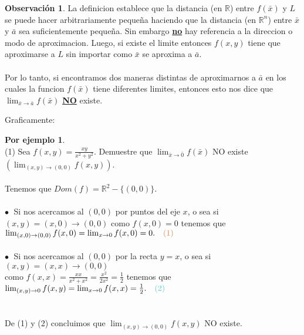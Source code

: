 \documentclass{article}
\theoremstyle{definition}
\theoremstyle{definition}
\newtheorem*{obs}{Observación}
\newtheorem*{ej}{Por ejemplo}
\theoremstyle{remark}
\newcommand\bl{$\bullet\;$}
\begin{document}
\begin{obs}
  La definicion establece que la distancia (en $\mathbb{R}$) entre $f(\bar{x})$ y $L$ se puede hacer arbitrariamente pequeña haciendo que la distancia (en $\mathbb{R}^n$) entre $\bar{x}$ y $\bar{a}$ sea suficientemente pequeña. Sin embargo \underline{\textbf{no}} hay referencia a la direccion o modo de aproximacion. Luego, si existe el limite entonces $f(x,y)$ tiene que aproximarse a $L$ sin importar como $\bar{x}$ se aproxima a $\bar{a}$. \\\\ Por lo tanto, si encontramos dos maneras distintas de aproximarnos a $\bar{a}$ en los cuales la funcion $f(\bar{x})$ tiene diferentes limites, entonces esto nos dice que $\lim_{\bar{x} \to \bar{a}}{f(\bar{x})}$ \underline{\textbf{NO}} existe.
\end{obs}\pagebreak
Graficamente:
\begin{figure}[h]
\centering
\def\svgwidth{0.55\textwidth}

\end{figure}
\begin{ej}
  \; \\
  \textcolor{verdep2}{(1)} Sea $f(x,y)=\frac{xy}{x^2+y^2}$. Demuestre que $\lim_{\bar{x} \to \bar{0}}{f(\bar{x})}$ NO existe $\left(\lim_{(x,y) \to (0,0)}{f(x,y)}\right)$.\\\\
  Tenemos que $Dom(f)=\mathbb{R}^2-\big\{(0,0)\big\}$.\\\\
\textcolor{rojop2}{\bl} Si nos acercamos al $(0,0)$ por puntos del eje $x$, o sea si $(x,y)=(x,0) \to (0,0)$ como $f(x,0)=0$ tenemos que $\lim_{(x,0) \to (0,0)}{f(x,0)}=\lim_{x\to 0}{f(x,0)}=0. \quad \textcolor{rojop2}{(1)}$\\\\
\textcolor{verdep2}{\bl} Si nos acercamos al $(0,0)$ por la recta $y=x$, o sea si $(x,y)=(x,x) \to (0,0)$ \\ como $f(x,x)=\frac{xx}{x^2+x^2}=\frac{x^2}{2x^2}=\frac{1}{2}$ tenemos que \mbox{$\lim_{(x,y) \to 0}{f(x,y)}=\lim_{x\to 0}{f(x,x)}=\frac{1}{2}.\quad \textcolor{verdep2}{\text{(2)}}$}\\\\\\
De \textcolor{rojop2}{(1)} y \textcolor{verdep2}{(2)} concluimos que $\lim_{(x,y)\to(0,0)}{f(x,y)}$ NO existe.
\end{ej}
\begin{figure}[h]
\centering
\def\svgwidth{0.35\textwidth}

\end{figure}
\end{document}
